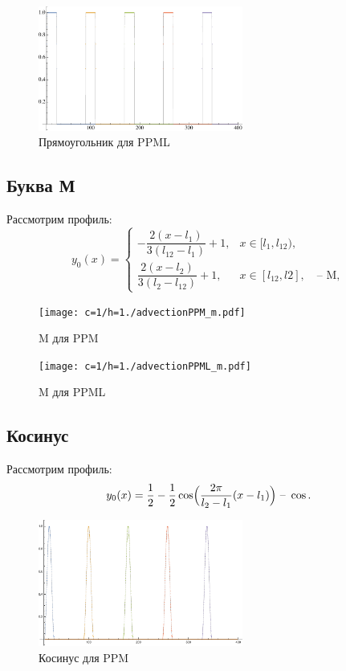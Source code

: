 \documentclass[12pt,a4paper]{article}
\begin{document}
    \begin{figure}[h]
        \centering
        \includegraphics[width=0.6\textwidth]{c=1/h=1./advectionPPML_rectangle.pdf}
        \caption{Прямоугольник для PPML}
        \label{fig:ppm_rectangle}
    \end{figure}

    \pagebreak
    
    \subsection{Буква М}
    Рассмотрим профиль:
    \[
        y_0(x) = \begin{cases}
            -\dfrac{2(x-l_1)}{3(l_{12}-l_1)} + 1, & x \in [l_1, l_{12}), \\[1em]
            \dfrac{2(x-l_{2})}{3(l_2 - l_{12})} + 1, & x \in [l_{12}, l2], \quad \text{-- M},
        \end{cases}
    \]

    \begin{figure}[h]
        \centering
        \texttt{[image: c=1/h=1./advectionPPM\_m.pdf]}
        \caption{M для PPM}
        \label{fig:ppm_m}
    \end{figure}

    \begin{figure}[h]
        \centering
        \texttt{[image: c=1/h=1./advectionPPML\_m.pdf]}
        \caption{M для PPML}
        \label{fig:ppm_m}
    \end{figure}

    \pagebreak

    \subsection{Косинус}
    Рассмотрим профиль:
    \[
        y_0(x) = \dfrac{1}{2} - \dfrac{1}{2} \cos\Bigl(\dfrac{2 \pi}{l_2 - l_1}(x-l_1)\Bigr) \text{ -- }\cos.
    \]

    \begin{figure}[h]
        \centering
        \includegraphics[width=0.6\textwidth]{c=1/h=1./advectionPPM_cos.pdf}
        \caption{Косинус для PPM}
        \label{fig:ppm_cos}
    \end{figure}
\end{document}
